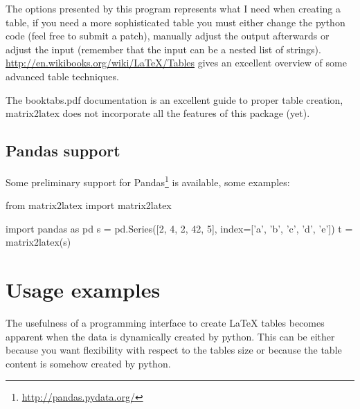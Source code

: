 {{The options presented by this program represents what I need when creating a table,
if you need a more sophisticated table you must either change the python code
(feel free to submit a patch), manually adjust the output afterwards
or adjust the input (remember that the input can be a nested list of strings).
\url{http://en.wikibooks.org/wiki/LaTeX/Tables} gives an excellent overview
of some advanced table techniques.

The booktabs.pdf documentation is an excellent guide to proper table creation,
matrix2latex does not incorporate all the features of this package (yet).

\subsection{Pandas support}
Some preliminary support for Pandas\footnote{\url{http://pandas.pydata.org/}}
is available, some examples:
\begin{pycode}[pandas]
from matrix2latex import matrix2latex
\end{pycode}
\begin{pyblock}[pandas]
import pandas as pd
s = pd.Series([2, 4, 2, 42, 5], index=['a', 'b', 'c', 'd', 'e'])
t = matrix2latex(s)
\end{pyblock}

\section{Usage examples}
The usefulness of a programming interface to create \LaTeX{}
tables becomes apparent when the data is dynamically created by python.
This can be either because you want flexibility with respect to the tables size
or because the table content is somehow created by python.

}}
